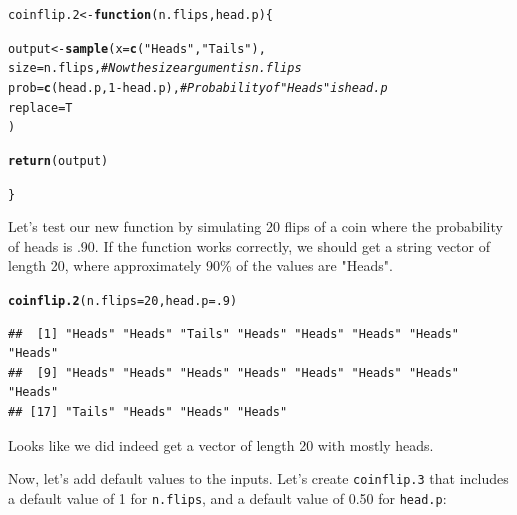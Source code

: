 \documentclass{tufte-book}\usepackage[]{graphicx}\usepackage[]{color}
\makeatletter
\newcommand{\hlnum}[1]{\textcolor[rgb]{0.686,0.059,0.569}{#1}}%
\newcommand{\hlstr}[1]{\textcolor[rgb]{0.192,0.494,0.8}{#1}}%
\newcommand{\hlcom}[1]{\textcolor[rgb]{0.678,0.584,0.686}{\textit{#1}}}%
\newcommand{\hlopt}[1]{\textcolor[rgb]{0,0,0}{#1}}%
\newcommand{\hlstd}[1]{\textcolor[rgb]{0.345,0.345,0.345}{#1}}%
\newcommand{\hlkwa}[1]{\textcolor[rgb]{0.161,0.373,0.58}{\textbf{#1}}}%
\newcommand{\hlkwb}[1]{\textcolor[rgb]{0.69,0.353,0.396}{#1}}%
\newcommand{\hlkwc}[1]{\textcolor[rgb]{0.333,0.667,0.333}{#1}}%
\newcommand{\hlkwd}[1]{\textcolor[rgb]{0.737,0.353,0.396}{\textbf{#1}}}%
\newenvironment{kframe}{%
 \def\at@end@of@kframe{}%
 \ifinner\ifhmode%
  \def\at@end@of@kframe{\end{minipage}}%
  \begin{minipage}{\columnwidth}%
 \fi\fi%
 \def\FrameCommand##1{\hskip\@totalleftmargin \hskip-\fboxsep
 \colorbox{shadecolor}{##1}\hskip-\fboxsep
     \hskip-\linewidth \hskip-\@totalleftmargin \hskip\columnwidth}%
 \MakeFramed {\advance\hsize-\width
   \@totalleftmargin\z@ \linewidth\hsize
   \@setminipage}}%
 {\par\unskip\endMakeFramed%
 \at@end@of@kframe}
\newenvironment{knitrout}{}{} %
\makeatother
\begin{document}
\begin{footnotesize}
\begin{knitrout}
\color{fgcolor}\begin{kframe}
\begin{alltt}
\hlstd{coinflip.2} \hlkwb{<-} \hlkwa{function} \hlstd{(}\hlkwc{n.flips}\hlstd{,} \hlkwc{head.p}\hlstd{) \{}

  \hlstd{output} \hlkwb{<-} \hlkwd{sample}\hlstd{(}\hlkwc{x} \hlstd{=} \hlkwd{c}\hlstd{(}\hlstr{"Heads"}\hlstd{,} \hlstr{"Tails"}\hlstd{),}
                   \hlkwc{size} \hlstd{= n.flips,} \hlcom{# Now the size argument is n.flips}
                   \hlkwc{prob} \hlstd{=} \hlkwd{c}\hlstd{(head.p,} \hlnum{1} \hlopt{-} \hlstd{head.p),} \hlcom{# Probability of "Heads" is head.p}
                   \hlkwc{replace} \hlstd{= T}
                   \hlstd{)}

  \hlkwd{return}\hlstd{(output)}

\hlstd{\}}
\end{alltt}
\end{kframe}
\end{knitrout}

Let's test our new function by simulating 20 flips of a coin where the probability of heads is .90. If the function works correctly, we should get a string vector of length 20, where approximately 90\% of the values are "Heads".

\begin{knitrout}
\color{fgcolor}\begin{kframe}
\begin{alltt}
\hlkwd{coinflip.2}\hlstd{(}\hlkwc{n.flips} \hlstd{=} \hlnum{20}\hlstd{,} \hlkwc{head.p} \hlstd{=} \hlnum{.9}\hlstd{)}
\end{alltt}
\begin{verbatim}
##  [1] "Heads" "Heads" "Tails" "Heads" "Heads" "Heads" "Heads" "Heads"
##  [9] "Heads" "Heads" "Heads" "Heads" "Heads" "Heads" "Heads" "Heads"
## [17] "Tails" "Heads" "Heads" "Heads"
\end{verbatim}
\end{kframe}
\end{knitrout}

Looks like we did indeed get a vector of length 20 with mostly heads.

Now, let's add default values to the inputs. Let's create \texttt{coinflip.3} that includes a default value of 1 for \texttt{n.flips}, and a default value of 0.50 for \texttt{head.p}:


\end{footnotesize}
\end{document}
